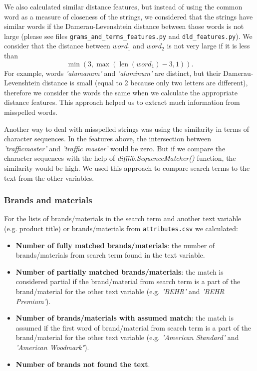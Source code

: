 \documentclass[12pt]{article}
\DeclareMathOperator{\len}{len}
\begin{document}
We also calculated similar distance features, but instead of using the common word
as a measure of closeness of the strings, we considered that the strings have similar
words if the Damerau-Levenshtein distance between those words is not large (please see
files \texttt{grams\_and\_terms\_features.py} and \texttt{dld\_features.py}). We consider that the distance between $word_1$ and $word_2$ is not very large if it is less than
 $$\min\left(3,\max\left(\len(word_1)-3,1\right)\right).$$
For example, words \emph{'alumanam'} and \emph{'aluminum'}
are distinct, but their Damerau-Levenshtein distance is small (equal to 2 because only
two letters are different), therefore we consider the words the same when we calculate the
appropriate distance features. This approach helped us to extract much information
from misspelled words.

Another way to deal with misspelled strings was using the similarity in terms of character sequences. In the features above, the intersection between \emph{'trafficmaster'} and \emph{'traffic master'} would be zero. But if we compare the character sequences with the help of \emph{difflib.SequenceMatcher()} function, the similarity would be high. We used this approach to compare search terms to the text from the other variables.

\subsubsection{Brands and materials}
\label{subsubsec:BM_IandK}
For the lists of brands/materials in the search term and another text variable (e.g. product title) or brands/materials from \texttt{attributes.csv} we calculated:
\begin{itemize}
\item \textbf{Number of fully matched brands/materials}: the number of brands/materials from search term found in the text variable.
\item \textbf{Number of partially matched brands/materials}: the match is considered partial if the brand/material from search term is a part of the brand/material for the other text variable (e.g. \emph{'BEHR'} and \emph{'BEHR Premium'}).
\item \textbf{Number of brands/materials with assumed match}: the match is assumed if the first word of brand/material from search term is a part of the brand/material for the other text variable (e.g. \emph{'American Standard'} and \emph{'American Woodmark"}).
\item \textbf{Number of brands not found the text}.
\end{itemize}
\end{document}
